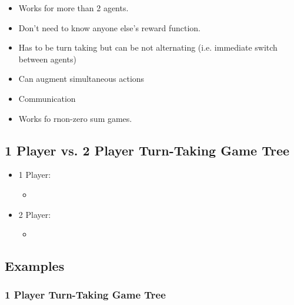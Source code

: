 \begin{warning}
    \begin{itemize}
        \item Works for more than 2 agents. 
        \item Don't need to know anyone else's reward function. 
        \item Has to be turn taking but can be not alternating (i.e. immediate switch between agents)
        \item Can augment simultaneous actions 
        \item Communication 
        \item Works fo rnon-zero sum games. 
    \end{itemize}
\end{warning}

\subsection{1 Player vs. 2 Player Turn-Taking Game Tree}
\begin{notes}
    \begin{itemize}
        \item 1 Player: 
        \begin{itemize}
            \item 
        \end{itemize}
        \item 2 Player: 
        \begin{itemize}
            \item 
        \end{itemize}
    \end{itemize}
\end{notes}
\newpage

\subsection{Examples}
\subsubsection{1 Player Turn-Taking Game Tree}
\newpage


